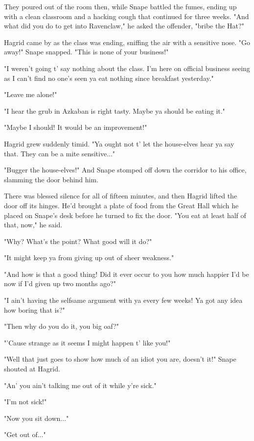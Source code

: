 They poured out of the room then, while Snape battled the fumes, ending up with a clean classroom and a hacking cough that continued for three weeks. "And what did you do to get into Ravenclaw," he asked the offender, "bribe the Hat?"

Hagrid came by as the class was ending, sniffing the air with a sensitive nose. "Go away!" Snape snapped. "This is none of your business!"

"I weren't going t' say nothing about the class. I'm here on official business seeing as I can't find no one's seen ya eat nothing since breakfast yesterday."

"Leave me alone!"

"I hear the grub in Azkaban is right tasty. Maybe ya should be eating it."

"Maybe I should! It would be an improvement!"

Hagrid grew suddenly timid. "Ya ought not t' let the house-elves hear ya say that. They can be a mite sensitive..."

"Bugger the house-elves!" And Snape stomped off down the corridor to his office, slamming the door behind him.

There was blessed silence for all of fifteen minutes, and then Hagrid lifted the door off its hinges. He'd brought a plate of food from the Great Hall which he placed on Snape's desk before he turned to fix the door. "You eat at least half of that, now," he said.

"Why? What's the point? What good will it do?"

"It might keep ya from giving up out of sheer weakness."

"And how is that a good thing! Did it ever occur to you how much happier I'd be now if I'd given up two months ago?"

"I ain't having the selfsame argument with ya every few weeks! Ya got any idea how boring that is?"

"Then why do you do it, you big oaf?"

"'Cause strange as it seems I might happen t' like you!"

"Well that just goes to show how much of an idiot you are, doesn't it!" Snape shouted at Hagrid.

"An' you ain't talking me out of it while y're sick."

"I'm not sick!"

"Now you sit down..."

"Get out of..."

